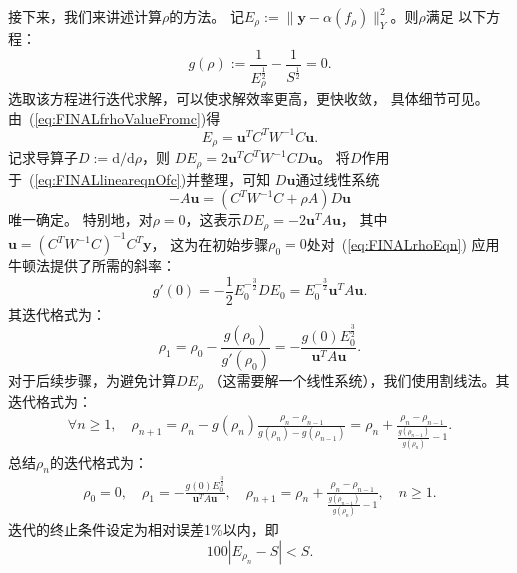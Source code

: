   接下来，我们来讲述计算$\rho$的方法。
  记$E_{\rho}:=\|\mathbf{y}-\alpha(f_{\rho})\|_{Y}^{2}$。则$\rho$满足
  以下方程：
  \begin{equation}
    \label{eq:FINALrhoEqn}
    g(\rho):=
    \frac{1}{E_{\rho}^{\frac{1}{2}}}
    -\frac{1}{S^{\frac{1}{2}}}=0.
  \end{equation}
  选取该方程进行迭代求解，可以使求解效率更高，更快收敛，
  具体细节可见\cite{Boor2001CALCULATIONOT,SmoothingBySplineFunctions}。
  由~(\ref{eq:FINALfrhoValueFromc})得
\begin{displaymath}
  E_{\rho}=\mathbf{u}^{T}C^{T}W^{-1}C\mathbf{u}.
\end{displaymath}
记求导算子$D:=\mathrm{d}/\mathrm{d}\rho$，则
$DE_{\rho}=2\mathbf{u}^{T}C^{T}W^{-1}CD\mathbf{u}$。
将$D$作用于~(\ref{eq:FINALlineareqnOfc})并整理，可知
$D\mathbf{u}$通过线性系统
\begin{displaymath}
  -A\mathbf{u}=(C^{T}W^{-1}C+\rho A)D\mathbf{u}
\end{displaymath}
唯一确定。
特别地，对$\rho=0$，这表示$DE_{\rho}=-2\mathbf{u}^{T}A\mathbf{u}$，
其中$\mathbf{u}=(C^{T}W^{-1}C)^{-1}C^{T}\mathbf{y}$，
这为在初始步骤$\rho_{0}=0$处对~(\ref{eq:FINALrhoEqn})
应用牛顿法提供了所需的斜率：
\begin{displaymath}
  g'(0)=-\frac{1}{2}E_{0}^{-\frac{3}{2}}DE_{0}
  =E_{0}^{-\frac{3}{2}}\mathbf{u}^{T}A\mathbf{u}.
\end{displaymath}
其迭代格式为：
\begin{displaymath}
  \rho_{1}=\rho_{0}-\frac{g(\rho_{0})}{g'(\rho_{0})}
  =-\frac{g(0)E_{0}^{\frac{3}{2}}}{\mathbf{u}^{T}A\mathbf{u}}.
\end{displaymath}
对于后续步骤，为避免计算$DE_{\rho}$
（这需要解一个线性系统），我们使用割线法。其迭代格式为：
\begin{align*}
  \forall n\ge 1, \quad
  \rho_{n+1}
    =\rho_{n}
      -g(\rho_{n})\frac{\rho_{n}-\rho_{n-1}}{g(\rho_{n})-g(\rho_{n-1})}
    =\rho_{n}
     +\frac{\rho_{n}-\rho_{n-1}}{\frac{g(\rho_{n-1})}{g(\rho_{n})}-1}.
\end{align*}
总结$\rho_{n}$的迭代格式为：
\begin{equation}
  \label{eq:FINALrhoIter}
  \begin{aligned}
    \rho_{0}=0,\quad
    \rho_{1}
      =-\frac{g(0)E_{0}^{\frac{3}{2}}}{\mathbf{u}^{T}A\mathbf{u}},\quad
    \rho_{n+1}
    =\rho_{n}+\frac{\rho_{n}-\rho_{n-1}}{\frac{g(\rho_{n-1})}{g(\rho_{n})}-1},
      \quad n\ge 1.
  \end{aligned}
\end{equation}
迭代的终止条件设定为相对误差1\%以内，即
\begin{equation}
  \label{eq:FINALrhoIterEnd}
  100|E_{\rho_{n}}-S|<S.
\end{equation}

